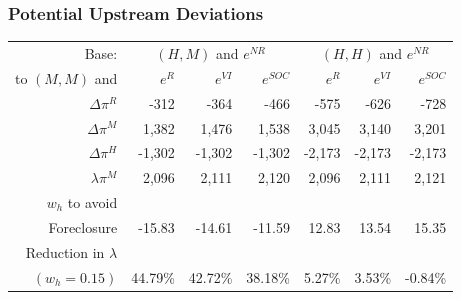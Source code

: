 \documentclass[aspectratio=169,11pt]{beamer}
\begin{document}
\begin{frame}[label=moredeviations]
\frametitle{Potential Upstream Deviations}
\footnotesize
\begin{table}[htp]
\begin{center}
\begin{tabular}{| r | r r r | r r r|} 
\hline
\multicolumn{1}{|r|}{Base: }& \multicolumn{3}{c|}{$(H,M)$ and $e^{NR}$ }  & \multicolumn{3}{c|}{ $(H,H)$ and $e^{NR}$} \\ 
\multicolumn{1}{|r|}{to  $(M,M)$ and}& $e^{R}$ & $e^{VI}$ & $e^{SOC}$ & $e^{R}$ & $e^{VI}$ & $e^{SOC}$ \\ \hline
$\Delta \pi^R$ & -312 & -364 & -466 & -575 & -626 & -728 \\
$\Delta \pi^M$ & 1,382 & 1,476 & 1,538 & 3,045 & 3,140 & 3,201 \\
$\Delta \pi^H$ & -1,302 & -1,302 & -1,302 & -2,173 & -2,173 & -2,173 \\
$\lambda \pi^M$ & 2,096 & 2,111 & 2,120& 2,096 & 2,111 & 2,121 \\ \hline
$w_h$ to avoid &&&&&&\\
Foreclosure & -15.83 & -14.61 & -11.59 & 12.83 & 13.54 & 15.35 \\
Reduction in $\lambda$ &&&&&&\\
$(w_h=0.15)$ & 44.79\% & 42.72\% & 38.18\% & 5.27\% & 3.53\% & -0.84\% \\ \hline
\end{tabular}
\end{center}
\label{tab:discount}
\end{table}
\hyperlink{deviations}{}
\end{frame}
\end{document}
